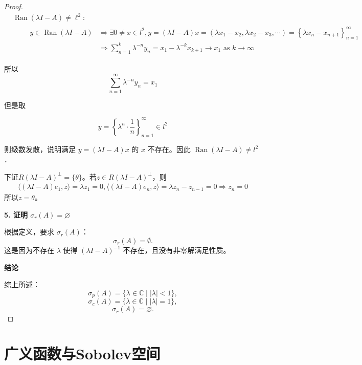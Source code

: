 \documentclass[lang=cn,newtx,10pt,scheme=chinese,thmcnt=chapter]{elegantbook}
\begin{document}
\begin{proof}
\begin{equation*}
\begin{aligned}
& \operatorname{Ran}(\lambda I-A) \neq \ell^2: \\
& \qquad \begin{aligned}
y \in \operatorname{Ran}(\lambda I-A) & \Rightarrow \exists 0 \neq x \in l^2, y=(\lambda I-A) x=\left(\lambda x_1-x_2, \lambda x_2-x_3, \cdots\right)=\left\{\lambda x_n-x_{n+1}\right\}_{n=1}^{\infty} \\
& \Rightarrow \sum_{n=1}^k \lambda^{-n} y_n=x_1-\lambda^{-k} x_{k+1} \rightarrow x_1 \text { as } k \rightarrow \infty
\end{aligned}
\end{aligned}
\end{equation*}

所以
\begin{equation*}
\sum_{n=1}^{\infty} \lambda^{-n} y_n=x_1
\end{equation*}

但是取

\begin{equation*}
y=\left\{\lambda^n \cdot \frac{1}{n}\right\}_{n=1}^{\infty} \in l^2
\end{equation*}

则级数发散，说明满足 $y=(\lambda I-A) x$ 的 $x$ 不存在。因此 $\operatorname{Ran}(\lambda I-A) \neq l^2$ ．

下证$R(\lambda I-A)^\perp =\{\theta\}$。若$z\in R(\lambda I-A)^\perp$，则
\begin{equation*}
    \begin{aligned}
 \langle (\lambda I-A)e_1,z\rangle=\lambda z_1=0,        \langle (\lambda I-A)e_n,z\rangle=\lambda z_n-z_{n-1}=0\Rightarrow z_n=0 
    \end{aligned}
\end{equation*}
所以$z=\theta$。

\textbf{5. 证明  $\sigma_r(A) = \varnothing$}

根据定义，要求 $\sigma_r(A)$：
\[
\sigma_r(A) = \emptyset.
\]
这是因为不存在 $\lambda$ 使得 $(\lambda I - A)^{-1}$ 不存在，且没有非零解满足性质。

\textbf{结论}

综上所述：
\[
\sigma_p(A) = \{\lambda \in \mathbb{C} \mid |\lambda| < 1\},
\]
\[
\sigma_c(A) = \{\lambda \in \mathbb{C} \mid |\lambda| = 1\},
\]
\[
\sigma_r(A) = \varnothing.
\]
\end{proof}
\chapter{广义函数与Sobolev空间}
\end{document}
